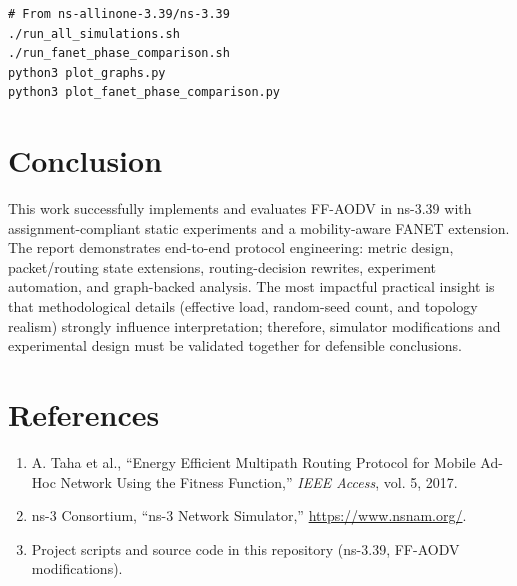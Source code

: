 \documentclass[12pt,a4paper]{article}
\begin{document}
\begin{verbatim}
# From ns-allinone-3.39/ns-3.39
./run_all_simulations.sh
./run_fanet_phase_comparison.sh
python3 plot_graphs.py
python3 plot_fanet_phase_comparison.py
\end{verbatim}

\section{Conclusion}
This work successfully implements and evaluates FF-AODV in ns-3.39 with assignment-compliant static experiments and a mobility-aware FANET extension. The report demonstrates end-to-end protocol engineering: metric design, packet/routing state extensions, routing-decision rewrites, experiment automation, and graph-backed analysis. The most impactful practical insight is that methodological details (effective load, random-seed count, and topology realism) strongly influence interpretation; therefore, simulator modifications and experimental design must be validated together for defensible conclusions.

\section*{References}
\begin{enumerate}[leftmargin=1.5em]
    \item A. Taha et al., ``Energy Efficient Multipath Routing Protocol for Mobile Ad-Hoc Network Using the Fitness Function,'' \textit{IEEE Access}, vol. 5, 2017.
    \item ns-3 Consortium, ``ns-3 Network Simulator,'' \url{https://www.nsnam.org/}.
    \item Project scripts and source code in this repository (ns-3.39, FF-AODV modifications).
\end{enumerate}
\end{document}
